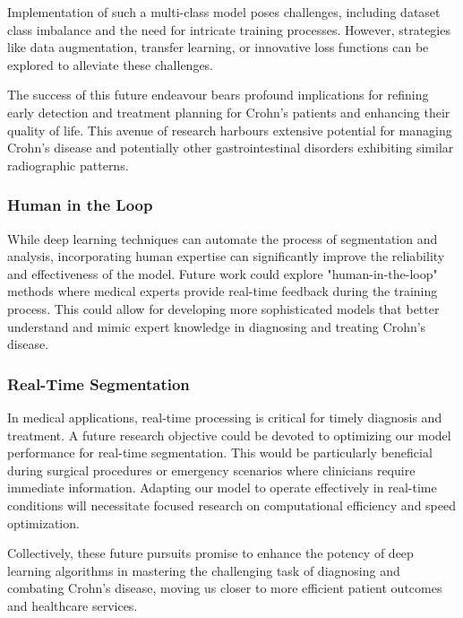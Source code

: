 Implementation of such a multi-class model poses challenges, including dataset class imbalance and the need for intricate training processes. However, strategies like data augmentation, transfer learning, or innovative loss functions can be explored to alleviate these challenges.

The success of this future endeavour bears profound implications for refining early detection and treatment planning for Crohn’s patients and enhancing their quality of life. This avenue of research harbours extensive potential for managing Crohn’s disease and potentially other gastrointestinal disorders exhibiting similar radiographic patterns.


\subsubsection*{Human in the Loop}

While deep learning techniques can automate the process of segmentation and analysis, incorporating human expertise can significantly improve the reliability and effectiveness of the model. Future work could explore "human-in-the-loop" methods where medical experts provide real-time feedback during the training process. This could allow for developing more sophisticated models that better understand and mimic expert knowledge in diagnosing and treating Crohn's disease.

\subsubsection*{Real-Time Segmentation}
In medical applications, real-time processing is critical for timely diagnosis and treatment. A future research objective could be devoted to optimizing our model performance for real-time segmentation. This would be particularly beneficial during surgical procedures or emergency scenarios where clinicians require immediate information. Adapting our model to operate effectively in real-time conditions will necessitate focused research on computational efficiency and speed optimization.

Collectively, these future pursuits promise to enhance the potency of deep learning algorithms in mastering the challenging task of diagnosing and combating Crohn's disease, moving us closer to more efficient patient outcomes and healthcare services.
